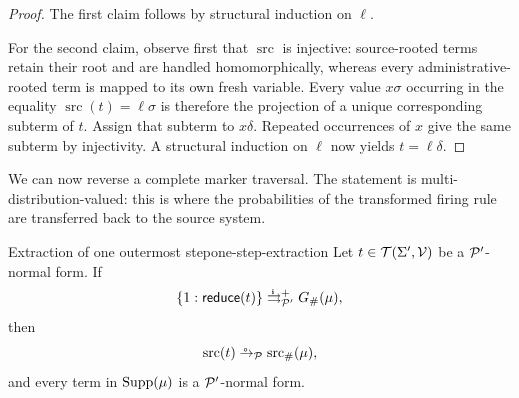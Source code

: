 \begin{proof}
  The first claim follows by structural induction on \(\ell\).

  For the second claim, observe first that \(\operatorname{src}\) is
  injective: source-rooted terms retain their root and are handled
  homomorphically, whereas every administrative-rooted term is mapped to its
  own fresh variable.  Every value \(x\sigma\) occurring in the equality
  \(\operatorname{src}(t)=\ell\sigma\) is therefore the projection of a
  unique corresponding subterm of \(t\).  Assign that subterm to
  \(x\delta\).  Repeated occurrences of \(x\) give the same subterm by
  injectivity.  A structural induction on \(\ell\) now yields
  \(t=\ell\delta\).
\end{proof}

We can now reverse a complete marker traversal.  The statement is
multi-distribution-valued: this is where the probabilities of the transformed
firing rule are transferred back to the source system.

\begin{Lemma}{Extraction of one outermost step}{one-step-extraction}
  Let \(t\in\TSet{\Sigma'}{\Var}\) be a \(\P'\)-normal form.  If
  \[
    \{1:\treduce(t)\}
      \iliftto_{\P'}^{+}
      G_{\#}(\mu),
  \]
  then
  \[
    \operatorname{src}(t)
      \oto_{\P}
      \operatorname{src}_{\#}(\mu),
  \]
  and every term in \(\Supp(\mu)\) is a \(\P'\)-normal form.
\end{Lemma}

